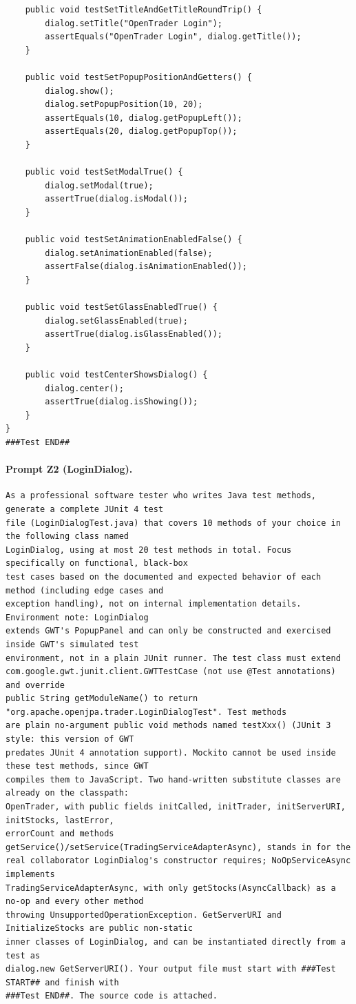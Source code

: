 \begin{lstlisting}
    public void testSetTitleAndGetTitleRoundTrip() {
        dialog.setTitle("OpenTrader Login");
        assertEquals("OpenTrader Login", dialog.getTitle());
    }

    public void testSetPopupPositionAndGetters() {
        dialog.show();
        dialog.setPopupPosition(10, 20);
        assertEquals(10, dialog.getPopupLeft());
        assertEquals(20, dialog.getPopupTop());
    }

    public void testSetModalTrue() {
        dialog.setModal(true);
        assertTrue(dialog.isModal());
    }

    public void testSetAnimationEnabledFalse() {
        dialog.setAnimationEnabled(false);
        assertFalse(dialog.isAnimationEnabled());
    }

    public void testSetGlassEnabledTrue() {
        dialog.setGlassEnabled(true);
        assertTrue(dialog.isGlassEnabled());
    }

    public void testCenterShowsDialog() {
        dialog.center();
        assertTrue(dialog.isShowing());
    }
}
###Test END##
\end{lstlisting}

\paragraph*{Prompt Z2 (LoginDialog).}
\label{prompt:ld-z2}
\begin{lstlisting}
As a professional software tester who writes Java test methods, generate a complete JUnit 4 test
file (LoginDialogTest.java) that covers 10 methods of your choice in the following class named
LoginDialog, using at most 20 test methods in total. Focus specifically on functional, black-box
test cases based on the documented and expected behavior of each method (including edge cases and
exception handling), not on internal implementation details. Environment note: LoginDialog
extends GWT's PopupPanel and can only be constructed and exercised inside GWT's simulated test
environment, not in a plain JUnit runner. The test class must extend
com.google.gwt.junit.client.GWTTestCase (not use @Test annotations) and override
public String getModuleName() to return "org.apache.openjpa.trader.LoginDialogTest". Test methods
are plain no-argument public void methods named testXxx() (JUnit 3 style: this version of GWT
predates JUnit 4 annotation support). Mockito cannot be used inside these test methods, since GWT
compiles them to JavaScript. Two hand-written substitute classes are already on the classpath:
OpenTrader, with public fields initCalled, initTrader, initServerURI, initStocks, lastError,
errorCount and methods getService()/setService(TradingServiceAdapterAsync), stands in for the
real collaborator LoginDialog's constructor requires; NoOpServiceAsync implements
TradingServiceAdapterAsync, with only getStocks(AsyncCallback) as a no-op and every other method
throwing UnsupportedOperationException. GetServerURI and InitializeStocks are public non-static
inner classes of LoginDialog, and can be instantiated directly from a test as
dialog.new GetServerURI(). Your output file must start with ###Test START## and finish with
###Test END##. The source code is attached.
\end{lstlisting}


